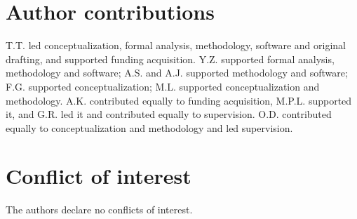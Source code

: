 \documentclass[namedate,webpdf,modern,large,nocrop]{oup-authoring-template}
\begin{document}
\section*{Author contributions}
T.T. led conceptualization, formal analysis, methodology, software and original drafting, and supported funding acquisition. Y.Z. supported formal analysis, methodology and software; A.S. and A.J. supported methodology and software; F.G. supported conceptualization; M.L. supported conceptualization and methodology. A.K. contributed equally to funding acquisition, M.P.L. supported it, and G.R. led it and contributed equally to supervision. O.D. contributed equally to conceptualization and methodology and led supervision.

\section*{Conflict of interest}
The authors declare no conflicts of interest.

\begingroup
\footnotesize
\setlength{\bibsep}{0pt}


\endgroup
\end{document}
